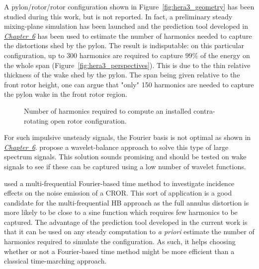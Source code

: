 A pylon/rotor/rotor configuration shown in Figure~\ref{fig:hera3_geometry}
has been studied during this work, but is not reported.
In fact, a preliminary steady mixing-plane simulation has been
launched and the prediction tool developed in
\hyperref[cha:limitations_convergence]{\emph{Chapter~6}}
has been used to estimate the number
of harmonics needed to capture the distortions shed by the pylon.
The result is indisputable: on this particular configuration,
up to 300 harmonics are required to capture $99\%$ of the energy
on the whole span (Figure~\ref{fig:hera3_perspectives}). 
This is due to the thin relative thickness of the
wake shed by the pylon.
The span being given relative to the front
rotor height, one can argue that "only" 150 harmonics are
needed to capture the pylon wake in the front rotor region.
\begin{figure}[htp]
  \centering
  \caption{Number of harmonics required to compute an 
  installed contra-rotating open rotor configuration.}
\end{figure}

For such impulsive unsteady signals, the Fourier basis
is not optimal as shown in 
\hyperref[cha:limitations_convergence]{\emph{Chapter~6}}.
\citet{Li2002} propose a wavelet-balance approach to
solve this type of large spectrum signals. This
solution sounds promising and should be tested on
wake signals to see if these can be captured
using a low number of wavelet functions.

\citet{Ferrante2013} used a multi-frequential Fourier-based time
method to investigate incidence effects on the noise
emission of a CROR. This sort of application is a good candidate
for the multi-frequential HB approach as the full annulus
distortion is more likely to be close to a sine function which
requires few harmonics to be captured. The advantage of the
prediction tool developed in the current work is that
it can be used on any steady computation to \emph{a priori}
estimate the number of harmonics required to simulate the
configuration. As such, it helps choosing whether or not
a Fourier-based time method might be more efficient than
a classical time-marching approach.


\subsection*{}

